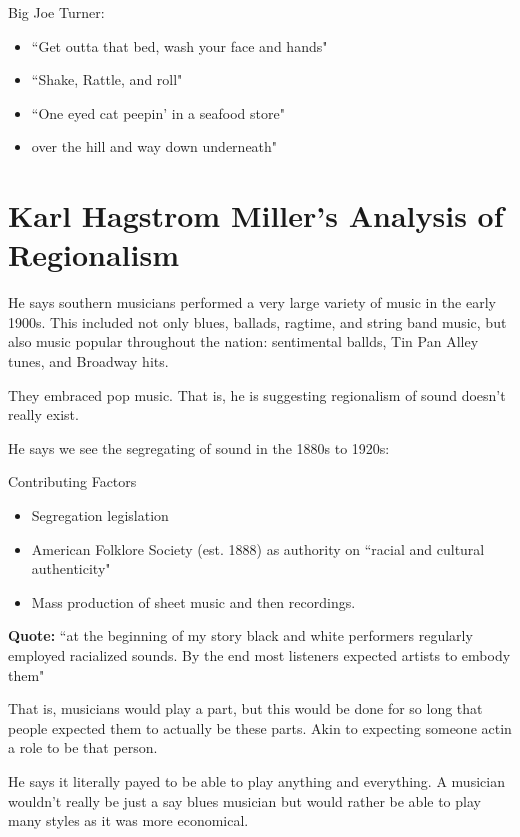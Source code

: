 \documentclass[12pt, a4paper, twoside, openright, titlepage]{book}
\begin{document}
\begin{eg}{}{}
    Big Joe Turner: \begin{itemize}
        \item ``Get outta that bed, wash your face and hands"
        \item ``Shake, Rattle, and roll"
        \item ``One eyed cat peepin' in a seafood store"
        \item over the hill and way down underneath"
    \end{itemize}
\end{eg}

\section{Karl Hagstrom Miller's Analysis of Regionalism}

He says southern musicians performed a very large variety of music in the early 1900s. This included not only blues, ballads, ragtime, and string band music, but also music popular throughout the nation: sentimental ballds, Tin Pan Alley tunes, and Broadway hits.

They embraced pop music. That is, he is suggesting regionalism of sound doesn't really exist.

He says we see the segregating of sound in the 1880s to 1920s:

\begin{rmk}{Contributing Factors}{}
    \leavevmode
    \begin{itemize}
        \item Segregation legislation
        \item American Folklore Society (est. 1888) as authority on ``racial and cultural authenticity"
        \item Mass production of sheet music and then recordings.
    \end{itemize}
\end{rmk}

\textbf{Quote:} ``at the beginning of my story black and white performers regularly employed racialized sounds. By the end most listeners expected artists to embody them"

That is, musicians would play a part, but this would be done for so long that people expected them to actually be these parts. Akin to expecting someone actin a role to be that person. 


He says it literally payed to be able to play anything and everything. A musician wouldn't really be just a say blues musician but would rather be able to play many styles as it was more economical.
\end{document}
